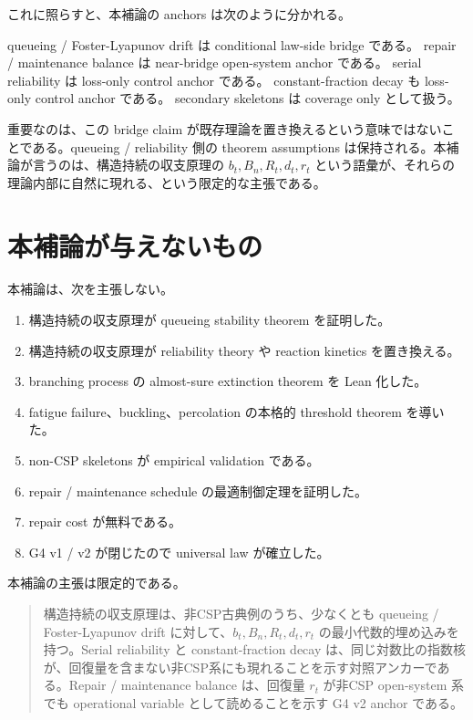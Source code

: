 \documentclass[12pt,a4paper]{article}
\begin{document}
これに照らすと、本補論の anchors は次のように分かれる。

queueing / Foster-Lyapunov drift は conditional law-side bridge である。 repair / maintenance balance は near-bridge open-system anchor である。 serial reliability は loss-only control anchor である。 constant-fraction decay も loss-only control anchor である。 secondary skeletons は coverage only として扱う。

重要なのは、この bridge claim が既存理論を置き換えるという意味ではないことである。queueing / reliability 側の theorem assumptions は保持される。本補論が言うのは、構造持続の収支原理の \(b_{t},B_{n},R_{t},d_{t},r_{t}\) という語彙が、それらの理論内部に自然に現れる、という限定的な主張である。

\section{本補論が与えないもの}\label{ux672cux88dcux8ad6ux304cux4e0eux3048ux306aux3044ux3082ux306e}

本補論は、次を主張しない。

\begin{enumerate}
\def\labelenumi{\arabic{enumi}.}
\tightlist
\item
  構造持続の収支原理が queueing stability theorem を証明した。
\item
  構造持続の収支原理が reliability theory や reaction kinetics を置き換える。
\item
  branching process の almost-sure extinction theorem を Lean 化した。
\item
  fatigue failure、buckling、percolation の本格的 threshold theorem を導いた。
\item
  non-CSP skeletons が empirical validation である。
\item
  repair / maintenance schedule の最適制御定理を証明した。
\item
  repair cost が無料である。
\item
  G4 v1 / v2 が閉じたので universal law が確立した。
\end{enumerate}

本補論の主張は限定的である。

\begin{quote}
構造持続の収支原理は、非CSP古典例のうち、少なくとも queueing / Foster-Lyapunov drift に対して、$b_{t},B_{n},R_{t},d_{t},r_{t}$ の最小代数的埋め込みを持つ。Serial reliability と constant-fraction decay は、同じ対数比の指数核が、回復量を含まない非CSP系にも現れることを示す対照アンカーである。Repair / maintenance balance は、回復量 $r_{t}$ が非CSP open-system 系でも operational variable として読めることを示す G4 v2 anchor である。
\end{quote}
\end{document}
